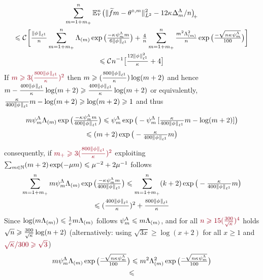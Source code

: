 \begin{pro}
\begin{multline*}
\sum_{\Di=1+\pDi}^{\ssY}\FuEx[\ssY]{\rY}\vectp{\VnormLp{\txdfPr[\Di]-\xdfPr[\Di]}^2-\penSv}\\\hfill\leq \cst{}\bigg[\tfrac{\Vnormlp[1]{\fydf}}{\ssY}\sum_{\Di=1+\pDi}^{\ssY}
\miSv\exp\big(\tfrac{-\cpen\cmSv\Di}{6\Vnormlp[1]{\fydf}}\big)+\tfrac{4}{n}\sum_{\Di=1+\pDi}^{\ssY}\tfrac{\Di^2\miSv^2}{n}\exp\big(\tfrac{-\sqrt{n\cpen\cmSv}}{100}\big)
\bigg]\\\leq \cst{}\ssY^{-1}\big[\tfrac{12\Vnormlp[1]{\fydf}^2}{\cpen}+4\big]
\end{multline*}
If   $\dr\Di\geq 3(\tfrac{800\Vnormlp[1]{\fydf}}{\cpen})^2$ then 
$\Di\geq  (\tfrac{800\Vnormlp[1]{\fydf}}{\cpen})\log(\Di+2)$ and
hence
$\Di-\tfrac{400\Vnormlp[1]{\fydf}}{\cpen}\log(\Di+2)\geq\tfrac{400\Vnormlp[1]{\fydf}}{\cpen}\log(\Di+2)$
or equivalently,
$\tfrac{\cpen}{400\Vnormlp[1]{\fydf}}\Di-\log(\Di+2)\geq\log(\Di+2)\geq1$
and thus
\begin{multline*}
\Di\cmSv\miSv\exp\big(\tfrac{-\cpen\cmSv\Di}{400\Vnormlp[1]{\fydf}}\big)\leq
\cmSv\exp\big(-\cmSv\,[\tfrac{\cpen}{400\Vnormlp[1]{\fydf}}\Di-\log(\Di+2)]\big)\\\leq
(\Di+2)\exp\big(-\tfrac{\cpen}{400\Vnormlp[1]{\fydf}}\Di\big)%
\end{multline*}
consequently, if $\dr\pDi\geq
3(\tfrac{800\Vnormlp[1]{\fydf}}{\cpen})^2$ exploiting $\sum_{\Di\in\Nz}(\Di+2)\exp(-\mu\Di)\leq \mu^{-2}+ 2\mu^{-1}$
follows
\begin{multline*}
\sum_{\Di=1+\pDi}^{\ssY}\Di\cmSv\miSv\exp\big(\tfrac{-\cpen\cmSv\Di}{400\Vnormlp[1]{\fydf}}\big)\leq
\sum_{\Di=1+\pDi}^{\ssY}(k+2)\exp\big(-\tfrac{\cpen}{400\Vnormlp[1]{\fydf}}\Di\big)
\\\leq (\tfrac{400\Vnormlp[1]{\fydf}}{\cpen})^2+\tfrac{800\Vnormlp[1]{\fydf}}{\cpen}
\end{multline*}
Since $\log(\Di\miSv)\leq \tfrac{1}{e}\Di\miSv$ follows $\cmSv\leq\Di\miSv$,
and  for all $\dr n\geq 15(\tfrac{300}{\sqrt{\cpen}})^4$ holds $\sqrt{n}\geq\tfrac{300}{\sqrt{\cpen}}\log(n+2)$
({\dgrau alternatively: using $\sqrt{3x}\geq\log(x+2)$ for all $x\geq1$ and $\dr\sqrt{\cpen}/300\geq\sqrt{3}$})
\begin{multline*}
\Di\cmSv\miSv\exp\big(\tfrac{-\sqrt{n\cpen\cmSv}}{100}\big)\leq
\Di^2\miSv^2\exp\big(\tfrac{-\sqrt{n\cpen\cmSv}}{100}\big)\\\leq

\end{multline*}
\end{pro}
